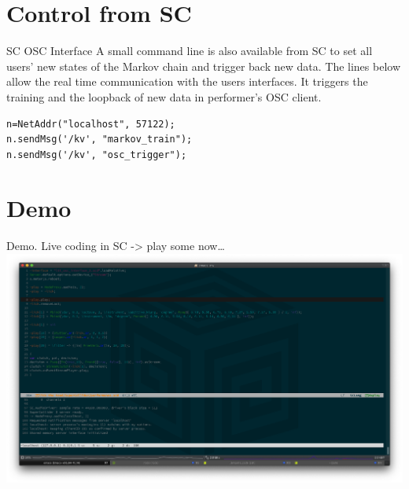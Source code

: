 \documentclass[t, 10pt, seahorse, bigger]{beamer}
\begin{document}
\section{Control from SC}
\label{sec:org504a919}
\begin{frame}[label={sec:org9b5ac01},fragile]{SC OSC Interface}
 A small command line is also available from SC to set all users' new states of the Markov chain and trigger back new data. The lines below allow the real time communication with the users interfaces. It triggers the training and the loopback of new data in performer's OSC client.
\begin{verbatim}
n=NetAddr("localhost", 57122);
n.sendMsg('/kv', "markov_train");
n.sendMsg('/kv', "osc_trigger");
\end{verbatim}
\end{frame}
\section{Demo}
\label{sec:org13f32dc}
\begin{frame}[label={sec:orgf6b4e19}]{Demo.}
Live coding in SC -> play some now\ldots{}
\includegraphics[height=1.0\textwidth]{./screens/live-coding.png}
\end{frame}
\end{document}
